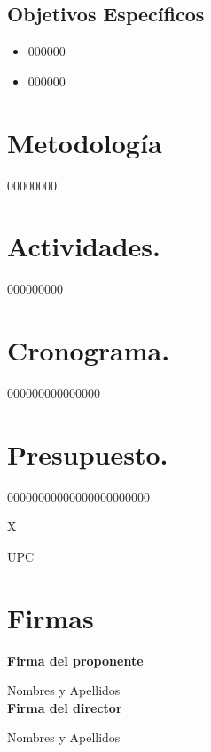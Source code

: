 \documentclass[10pt]{article}
\begin{document}
\subsection{Objetivos Específicos}
\begin{itemize}
\item 000000
\item 000000
\end{itemize}



\section{Metodología}

00000000

\section{Actividades.}
000000000


\section{Cronograma.}
000000000000000



\section{Presupuesto.}
00000000000000000000000


\begin{thebibliography}{X}

 UPC

\end{thebibliography}  

\newpage

\section{Firmas}

\textbf{Firma del proponente}
\\[20pt]


\makebox[2.5in]{\hrulefill} 

Nombres y Apellidos\\ 

\textbf{Firma del director}
\\[20pt]


\makebox[2.5in]{\hrulefill} 

Nombres y Apellidos\\ 
\end{document}
